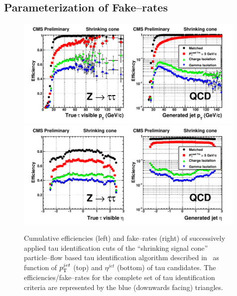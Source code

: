\subsection{Parameterization of Fake--rates}
\label{secFakeRateParametrization}
%
\begin{figure}[t]
\setlength{\unitlength}{1mm}
\begin{center}
\includegraphics*[width=0.99\textwidth]{backgrounds_chapter/figures/valStyle_HighEfficiency_pt.pdf}
\includegraphics*[width=0.99\textwidth]{backgrounds_chapter/figures/valStyle_HighEfficiency_eta.pdf}
\caption[$\pt$ and $\eta$ dependency of tau ID performance]{Cumulative
efficiencies (left) and fake--rates (right) of successively applied tau
identification cuts of the ``shrinking signal cone'' particle--flow based tau
identification algorithm described in~\cite{CMS-PAS-PFT-08-001} as function of
$p_{\mathrm{T}}^{jet}$ (top) and $\eta^{jet}$ (bottom) of tau candidates.  The
efficiencies/fake--rates for the complete set of tau identification criteria are
represented by the blue (downwards facing) triangles.}
\label{figPFTauReco_EfficienciesAndFakeRates}
\end{center}
\end{figure} 

